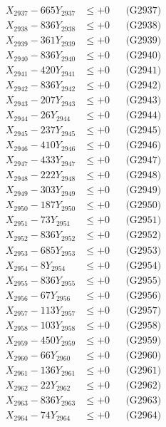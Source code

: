 \documentclass[a4paper,10pt]{article}
\begin{document}
{\begin{align}
X_{2937} - 665Y_{2937} &\leq +0 && \text{(G2937)} \\
X_{2938} - 836Y_{2938} &\leq +0 && \text{(G2938)} \\
X_{2939} - 361Y_{2939} &\leq +0 && \text{(G2939)} \\
X_{2940} - 836Y_{2940} &\leq +0 && \text{(G2940)} \\
\allowbreak
X_{2941} - 420Y_{2941} &\leq +0 && \text{(G2941)} \\
X_{2942} - 836Y_{2942} &\leq +0 && \text{(G2942)} \\
X_{2943} - 207Y_{2943} &\leq +0 && \text{(G2943)} \\
X_{2944} - 26Y_{2944} &\leq +0 && \text{(G2944)} \\
X_{2945} - 237Y_{2945} &\leq +0 && \text{(G2945)} \\
X_{2946} - 410Y_{2946} &\leq +0 && \text{(G2946)} \\
X_{2947} - 433Y_{2947} &\leq +0 && \text{(G2947)} \\
X_{2948} - 222Y_{2948} &\leq +0 && \text{(G2948)} \\
X_{2949} - 303Y_{2949} &\leq +0 && \text{(G2949)} \\
X_{2950} - 187Y_{2950} &\leq +0 && \text{(G2950)} \\
\allowbreak
X_{2951} - 73Y_{2951} &\leq +0 && \text{(G2951)} \\
X_{2952} - 836Y_{2952} &\leq +0 && \text{(G2952)} \\
X_{2953} - 685Y_{2953} &\leq +0 && \text{(G2953)} \\
X_{2954} - 8Y_{2954} &\leq +0 && \text{(G2954)} \\
X_{2955} - 836Y_{2955} &\leq +0 && \text{(G2955)} \\
X_{2956} - 67Y_{2956} &\leq +0 && \text{(G2956)} \\
X_{2957} - 113Y_{2957} &\leq +0 && \text{(G2957)} \\
X_{2958} - 103Y_{2958} &\leq +0 && \text{(G2958)} \\
X_{2959} - 450Y_{2959} &\leq +0 && \text{(G2959)} \\
X_{2960} - 66Y_{2960} &\leq +0 && \text{(G2960)} \\
\allowbreak
X_{2961} - 136Y_{2961} &\leq +0 && \text{(G2961)} \\
X_{2962} - 22Y_{2962} &\leq +0 && \text{(G2962)} \\
X_{2963} - 836Y_{2963} &\leq +0 && \text{(G2963)} \\
X_{2964} - 74Y_{2964} &\leq +0 && \text{(G2964)} \\

\end{align}}
\end{document}
